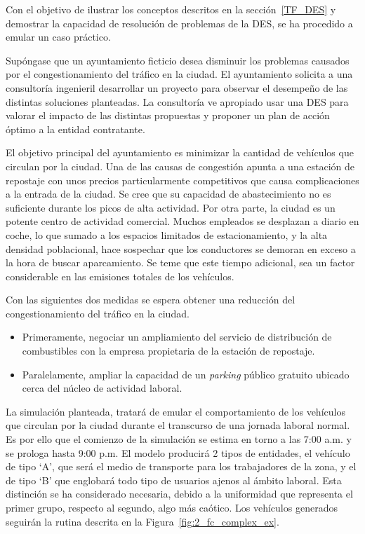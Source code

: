 Con el objetivo de ilustrar los conceptos descritos en la sección~\ref{TF_DES}
y demostrar la capacidad de resolución de problemas de la DES,
se ha procedido a emular un caso práctico.

Supóngase que un ayuntamiento ficticio desea disminuir
los problemas causados por el congestionamiento del tráfico en la ciudad.
El ayuntamiento solicita a una consultoría ingenieril
desarrollar un proyecto para observar el
desempeño de las distintas soluciones planteadas.
La consultoría ve apropiado usar una DES para valorar
el impacto de las distintas propuestas
y proponer un plan de acción óptimo a la entidad contratante.

El objetivo principal del ayuntamiento es
minimizar la cantidad de vehículos que circulan por la ciudad.
Una de las causas de congestión apunta a una estación de repostaje
con unos precios particularmente competitivos
que causa complicaciones a la entrada de la ciudad.
Se cree que su capacidad de abastecimiento
no es suficiente durante los picos de alta actividad.
Por otra parte, la ciudad es un potente centro de actividad comercial.
Muchos empleados se desplazan a diario en coche,
lo que sumado a los espacios limitados de estacionamiento,
y la alta densidad poblacional,
hace sospechar que los conductores se demoran en exceso
a la hora de buscar aparcamiento.
Se teme que este tiempo adicional,
sea un factor considerable en las emisiones totales de los vehículos.

Con las siguientes dos medidas se espera obtener
una reducción del congestionamiento del tráfico en la ciudad.

\begin{itemize}
	\item Primeramente, negociar un ampliamiento
		del servicio de distribución de combustibles
		con la empresa propietaria de la estación de repostaje.
	\item Paralelamente, ampliar la capacidad de un \textit{parking}
		público gratuito ubicado cerca del núcleo de actividad laboral.
\end{itemize}

La simulación planteada, tratará de emular el comportamiento de los vehículos
que circulan por la ciudad durante el transcurso de una jornada laboral normal.
Es por ello que el comienzo de la simulación se estima en torno a las 7:00 a.m.
y se prologa hasta 9:00 p.m.
El modelo producirá 2 tipos de entidades,
el vehículo de tipo `A',
que será el medio de transporte para los trabajadores de la zona,
y el de tipo `B' que englobará todo tipo de usuarios ajenos al ámbito laboral.
Esta distinción se ha considerado necesaria,
debido a la uniformidad que representa el primer grupo, respecto al segundo, algo más caótico.
Los vehículos generados seguirán la rutina descrita en la Figura~\ref{fig:2_fc_complex_ex}.

